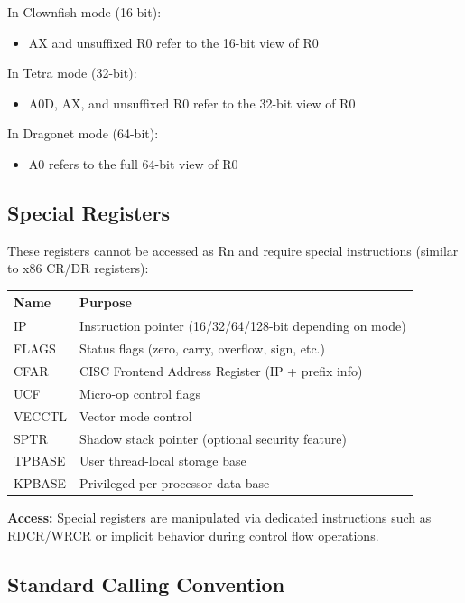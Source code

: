\documentclass[11pt]{article}
\begin{document}
In Clownfish mode (16-bit):
\begin{itemize}
    \item AX and unsuffixed R0 refer to the 16-bit view of R0
\end{itemize}

In Tetra mode (32-bit):
\begin{itemize}
    \item A0D, AX, and unsuffixed R0 refer to the 32-bit view of R0
\end{itemize}

In Dragonet mode (64-bit):
\begin{itemize}
    \item A0 refers to the full 64-bit view of R0
\end{itemize}

\subsection{Special Registers}

These registers cannot be accessed as Rn and require special instructions (similar to x86 CR/DR registers):

\begin{table}[h]
\centering
\begin{tabular}{@{}L{2.3cm}L{9.8cm}@{}}
\toprule
\textbf{Name} & \textbf{Purpose} \\ \midrule
IP & Instruction pointer (16/32/64/128-bit depending on mode) \\
FLAGS & Status flags (zero, carry, overflow, sign, etc.) \\
CFAR & CISC Frontend Address Register (IP + prefix info) \\
UCF & Micro-op control flags \\
VECCTL & Vector mode control \\
SPTR & Shadow stack pointer (optional security feature) \\
TPBASE & User thread-local storage base \\
KPBASE & Privileged per-processor data base \\ \bottomrule
\end{tabular}
\end{table}

\textbf{Access:} Special registers are manipulated via dedicated instructions such as RDCR/WRCR or implicit behavior during control flow operations.

\subsection{Standard Calling Convention}
\end{document}
